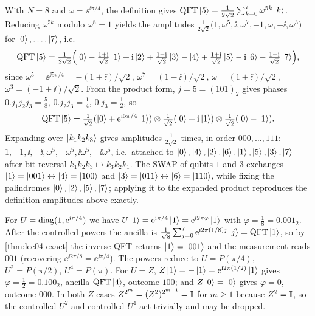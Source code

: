 \begin{solution}
With $N=8$ and $\omega=\ee^{\ii\pi/4}$, the definition gives
$\mathrm{QFT}\ket{5}=\tfrac{1}{2\sqrt2}\sum_{k=0}^{7}\omega^{5k}\ket{k}$. Reducing
$\omega^{5k}$ modulo $\omega^{8}=1$ yields the amplitudes
$\tfrac{1}{2\sqrt2}\bigl(1,\omega^{5},\ii,\omega^{7},-1,\omega,-\ii,
\omega^{3}\bigr)$ for $\ket{0},\dots,\ket{7}$, i.e.\
\[
  \mathrm{QFT}\ket{5}=\tfrac{1}{2\sqrt2}\Bigl(\ket{0}-\tfrac{1+\mathrm{i}}{\sqrt2}\ket{1}
  +\mathrm{i}\ket{2}+\tfrac{1-\mathrm{i}}{\sqrt2}\ket{3}-\ket{4}+\tfrac{1+\mathrm{i}}{\sqrt2}\ket{5}
  -\mathrm{i}\ket{6}-\tfrac{1-\mathrm{i}}{\sqrt2}\ket{7}\Bigr),
\]
since $\omega^{5}=\ee^{\ii 5\pi/4}=-(1+\ii)/\sqrt2$,
$\omega^{7}=(1-\ii)/\sqrt2$, $\omega=(1+\ii)/\sqrt2$,
$\omega^{3}=(-1+\ii)/\sqrt2$. From the product form, $j=5=(101)_2$ gives phases
$0.j_1 j_2 j_3=\tfrac58$, $0.j_2 j_3=\tfrac14$, $0.j_3=\tfrac12$, so
\[
  \mathrm{QFT}\ket{5}=\tfrac{1}{\sqrt2}(\ket{0}+\mathrm{e}^{\mathrm{i} 5\pi/4}\ket{1})\otimes
  \tfrac{1}{\sqrt2}(\ket{0}+\mathrm{i}\ket{1})\otimes
  \tfrac{1}{\sqrt2}(\ket{0}-\ket{1}).
\]
Expanding over $\ket{k_1 k_2 k_3}$ gives amplitudes $\tfrac{1}{2\sqrt2}$ times,
in order $000,\dots,111$: $1,-1,\ii,-\ii,\omega^{5},-\omega^{5},\ii\omega^{5},
-\ii\omega^{5}$, i.e.\ attached to $\ket{0},\ket{4},\ket{2},\ket{6},\ket{1},
\ket{5},\ket{3},\ket{7}$ after bit reversal $k_1 k_2 k_3\mapsto k_3 k_2 k_1$.
The SWAP of qubits $1$ and $3$ exchanges $\ket{1}=\ket{001}\leftrightarrow
\ket{4}=\ket{100}$ and $\ket{3}=\ket{011}\leftrightarrow\ket{6}=\ket{110}$,
while fixing the palindromes $\ket{0},\ket{2},\ket{5},\ket{7}$; applying it to
the expanded product reproduces the definition amplitudes above exactly.
\end{solution}

\begin{solution}
For $U=\operatorname{diag}(1,\mathrm{e}^{\mathrm{i}\pi/4})$ we have $U\ket{1}=\mathrm{e}^{\mathrm{i}\pi/4}\ket{1}
=\mathrm{e}^{\mathrm{i} 2\pi\varphi}\ket{1}$ with $\varphi=\tfrac18=0.001_2$. After the
controlled powers the ancilla is
$\tfrac{1}{\sqrt8}\sum_{j=0}^{7}\mathrm{e}^{\mathrm{i} 2\pi(1/8)j}\ket{j}=\mathrm{QFT}\ket{1}$, so by
\cref{thm:lec04-exact} the inverse QFT returns $\ket{1}=\ket{001}$ and the
measurement reads $001$ (recovering $\ee^{\ii 2\pi/8}=\ee^{\ii\pi/4}$). The
powers reduce to $U=P(\pi/4)$, $U^{2}=P(\pi/2)$, $U^{4}=P(\pi)$. For $U=Z$,
$Z\ket{1}=-\ket{1}=\mathrm{e}^{\mathrm{i} 2\pi(1/2)}\ket{1}$ gives $\varphi=\tfrac12=0.100_2$,
ancilla $\mathrm{QFT}\ket{4}$, outcome $100$; and $Z\ket{0}=\ket{0}$ gives $\varphi=0$,
outcome $000$. In both $Z$ cases $Z^{2^{m}}=(Z^{2})^{2^{m-1}}=\mathbb{I}$ for $m\ge1$
because $Z^{2}=\mathbb{I}$, so the controlled-$U^{2}$ and controlled-$U^{4}$ act
trivially and may be dropped.
\end{solution}
